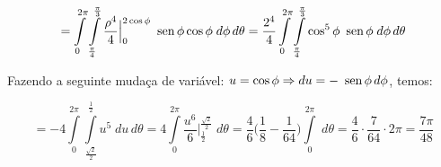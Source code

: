 \documentclass[12pt,a4paper]{article}
\newcommand{\sen}{\mbox{\, sen}\,}
\begin{document}
$$ = \int\limits_{0}^{2\pi} \int\limits_{\frac{\pi}{4}}^{\frac{\pi}{3}}  \frac{\rho^4}{4} \Big|_{0}^{2\cos\phi} \sen \phi \cos \phi \;d\phi\,d\theta = \frac{2^4}{4} \int\limits_{0}^{2\pi} \int\limits_{\frac{\pi}{4}}^{\frac{\pi}{3}}  \cos^5\phi \sen \phi \;d\phi\,d\theta  $$

Fazendo a seguinte mudaça de variável: $u = \cos\phi \Rightarrow du = -\sen\phi \, d\phi $, temos:

$$ = -4 \int\limits_{0}^{2\pi} \int\limits_{\frac{\sqrt{2}}{2}}^{\frac{1}{2}}  u^5 \;du\,d\theta = 4 \int\limits_{0}^{2\pi}  \frac{u^6}{6} \Big|_{\frac{1}{2}}^{\frac{\sqrt{2}}{2}} \;d\theta = \frac{4}{6} \Big( \frac{1}{8} - \frac{1}{64} \Big) \int\limits_{0}^{2\pi} \; d\theta= \frac{4}{6} \cdot \frac{7}{64} \cdot 2 \pi = \frac{7\pi}{48} $$
\end{document}
